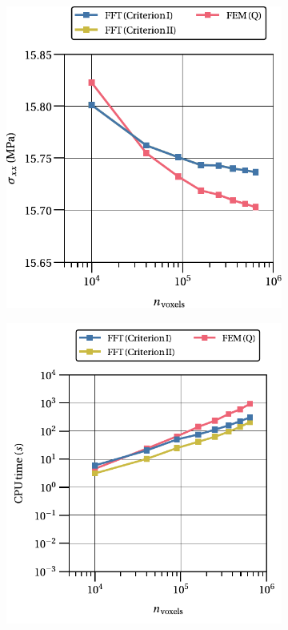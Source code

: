 \begin{figure}[hbt]
  \centering
	\begin{subfigure}[b]{0.49\textwidth}
    \centering
    \includegraphics[width=\textwidth]{figures/hencky_2D_normal_homo_stress_11_vs_n_voxels}
    \caption{}
    \label{subfig:hencky_2D_normal_homo_stress_11_vs_n_voxels}
  \end{subfigure}
  \begin{subfigure}[b]{0.49\textwidth}
    \centering
    \includegraphics[width=\textwidth]{figures/hencky_2D_normal_cpu_time_vs_n_voxels}

\end{subfigure}
\end{figure}
